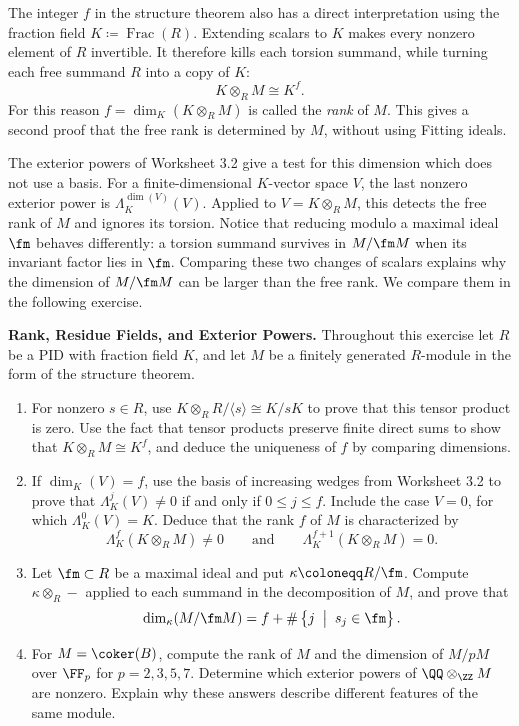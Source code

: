 \documentclass[12pt,reqno]{amsart}
\DeclareMathOperator{\Frac}{Frac}
\begin{document}
\hrulefill

The integer $f$ in the structure theorem also has a direct interpretation using the fraction field $K\coloneqq\Frac(R)$. Extending scalars to $K$ makes every nonzero element of $R$ invertible. It therefore kills each torsion summand, while turning each free summand $R$ into a copy of $K$:
\[
K\otimes_RM\cong K^f.
\]
For this reason $f=\dim_K(K\otimes_RM)$ is called the \emph{rank} of $M$. This gives a second proof that the free rank is determined by $M$, without using Fitting ideals.

The exterior powers of Worksheet 3.2 give a test for this dimension which does not use a basis. For a finite-dimensional $K$-vector space $V$, the last nonzero exterior power is $\Lambda_K^{\dim(V)}(V)$. Applied to $V=K\otimes_RM$, this detects the free rank of $M$ and ignores its torsion. Notice that reducing modulo a maximal ideal $\fm$ behaves differently: a torsion summand survives in $M/\fm M$ when its invariant factor lies in $\fm$. Comparing these two changes of scalars explains why the dimension of $M/\fm M$ can be larger than the free rank. We compare them in the following exercise.

\hrulefill

\begin{problems}
\item\label{s:rank} \textbf{Rank, Residue Fields, and Exterior Powers.} Throughout this exercise let $R$ be a PID with fraction field $K$, and let $M$ be a finitely generated $R$-module in the form of the structure theorem.
\begin{enumerate}
\item For nonzero $s\in R$, use $K\otimes_RR/\langle s\rangle\cong K/sK$ to prove that this tensor product is zero. Use the fact that tensor products preserve finite direct sums to show that $K\otimes_RM\cong K^f$, and deduce the uniqueness of $f$ by comparing dimensions.
\item If $\dim_K(V)=f$, use the basis of increasing wedges from Worksheet 3.2 to prove that $\Lambda_K^j(V)\ne0$ if and only if $0\leq j\leq f$. Include the case $V=0$, for which $\Lambda_K^0(V)=K$. Deduce that the rank $f$ of $M$ is characterized by
\[
\Lambda_K^f(K\otimes_RM)\ne0\qquad\text{and}\qquad\Lambda_K^{f+1}(K\otimes_RM)=0.
\]
\item Let $\fm\subset R$ be a maximal ideal and put $\kappa\coloneqq R/\fm$. Compute $\kappa\otimes_R-$ applied to each summand in the decomposition of $M$, and prove that
\[
\dim_{\kappa}(M/\fm M)=f+\#\left\{j \;\; \big| \;\; s_j\in\fm\right\}.
\]
\item For $M=\coker(B)$, compute the rank of $M$ and the dimension of $M/pM$ over $\FF_p$ for $p=2,3,5,7$. Determine which exterior powers of $\QQ\otimes_\ZZ M$ are nonzero. Explain why these answers describe different features of the same module.
\end{enumerate}
\end{problems}
\end{document}

